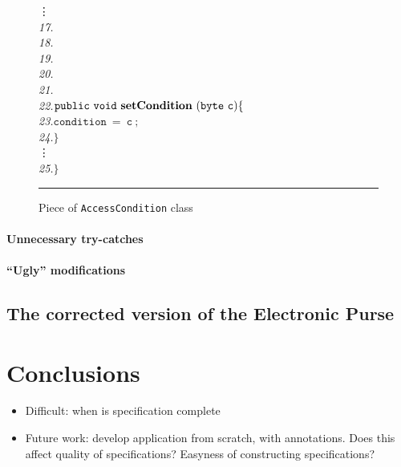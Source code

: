 \documentclass[a4paper]{llncs}
\begin{document}
\begin{center}
\begin{figure}[hbt]
\begin{tabbing}
\>\>\vdots \\

\emph{17.}\> \\
\emph{18.}\>\> \\
\emph{19.}\>\> \\
\emph{20.}\>\> \\
\emph{21.}\>\>{\it */} \\
\emph{22.}\>\>$\mathtt{public\ void\ {\bf setCondition}\ (byte\ c)\{}$\\
\emph{23.}\>\>\>$\mathtt{condition\ =\ c\ ;}$\\
\emph{24.}\>\>$\mathtt{\}}$\\

\>\>\vdots \\
\emph{25.}\>$\mathtt{\}}$
\end{tabbing}
\caption{Piece of {\tt AccessCondition} class}
\label{fig-cla-acc}
\rule{\linewidth}{0.3mm}
\end{figure}
\end{center}




\paragraph{Unnecessary try-catches}




\paragraph{``Ugly'' modifications}




\subsection{The corrected version of the Electronic Purse}






\section{Conclusions}
\label{SectConcl}
\begin{itemize}

\item Difficult: when is specification complete

\item Future work: develop application from scratch, with annotations. 
Does this affect quality of specifications? Easyness of constructing specifications?

\end{itemize}



\end{document}
